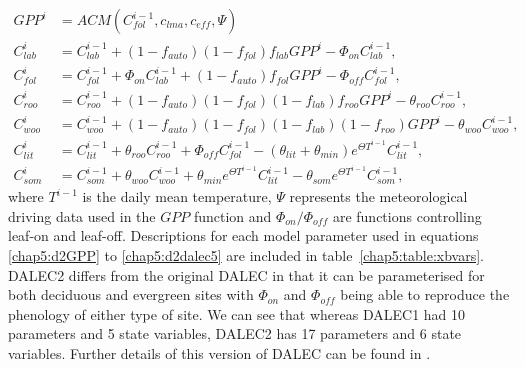 \begin{align}
GPP^{i} &= ACM(C_{fol}^{i-1}, c_{lma}, c_{eff}, \Psi) \label{chap5:d2GPP}
\\C_{lab}^{i}&=C_{lab}^{i-1}+(1-f_{auto})(1-f_{fol})f_{lab}GPP^{i}-\Phi _{on}C_{lab}^{i-1}, \label{daleclab}
\\C_{fol}^{i}&=C_{fol}^{i-1}+\Phi_{on}C_{lab}^{i-1}+(1-f_{auto})f_{fol}GPP^{i}-\Phi_{off}C_{fol}^{i-1}, \label{dalec1}
\\C_{roo}^{i}&=C_{roo}^{i-1}+(1-f_{auto})(1-f_{fol})(1-f_{lab})f_{roo}GPP^{i}-\theta_{roo}C_{roo}^{i-1}, 
\\C_{woo}^{i}&=C_{woo}^{i-1}+(1-f_{auto})(1-f_{fol})(1-f_{lab})(1-f_{roo})GPP^{i}-\theta_{woo}C_{woo}^{i-1}, 
\\C_{lit}^{i}&=C_{lit}^{i-1}+\theta_{roo}C_{roo}^{i-1}+\Phi_{off}C_{fol}^{i-1}-(\theta_{lit}+\theta_{min})e^{\Theta T^{i-1}}C_{lit}^{i-1}, 
\\C_{som}^{i}&=C_{som}^{i-1}+\theta_{woo}C_{woo}^{i-1}+\theta_{min}e^{\Theta T^{i-1}}C_{lit}^{i-1}-\theta_{som}e^{\Theta T^{i-1}}C_{som}^{i-1}, \label{chap5:d2dalec5}
\end{align}
where $T^{i-1}$ is the daily mean temperature, $\Psi$ represents the meteorological driving data used in the $GPP$ function and $\Phi_{on} / \Phi_{off}$ are functions controlling leaf-on and leaf-off. Descriptions for each model parameter used in equations \eqref{chap5:d2GPP} to \eqref{chap5:d2dalec5} are included in table~\ref{chap5:table:xbvars}. DALEC2 differs from the original DALEC in that it can be parameterised for both deciduous and evergreen sites with $\Phi_{on}$ and $\Phi_{off}$ being able to reproduce the phenology of either type of site. We can see that whereas DALEC1 had 10 parameters and 5 state variables, DALEC2 has 17 parameters and 6 state variables. Further details of this version of DALEC can be found in \cite{Bloom2015}. 

